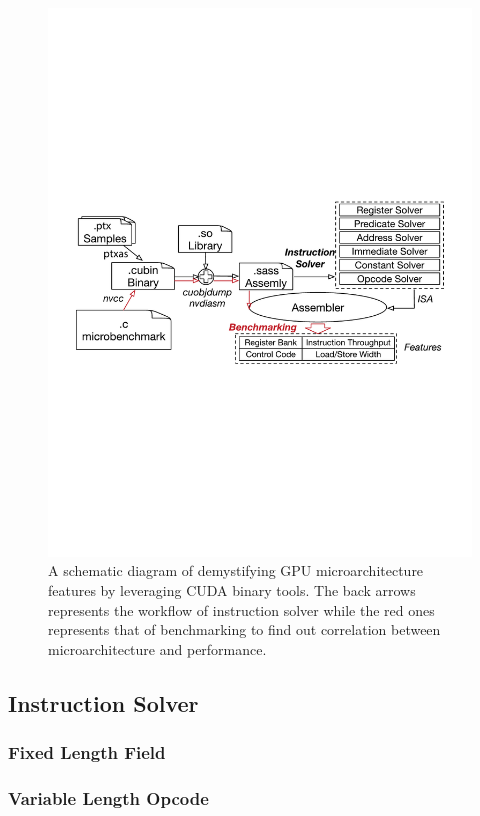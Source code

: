 \documentclass{sig-alternate-05-2015}
\begin{document}
\begin{figure}[htbp]
\begin{center}
\includegraphics[scale=0.45]{methodology}
\caption{A schematic diagram of demystifying GPU microarchitecture features by leveraging CUDA binary tools. The back arrows represents the workflow of instruction solver while the red ones represents that of benchmarking to find out correlation between microarchitecture and performance.}
\label{fig:workflow}
\end{center}
\end{figure}

\subsection{Instruction Solver}

\subsubsection{Fixed Length Field}
\subsubsection{Variable Length Opcode}
\end{document}
